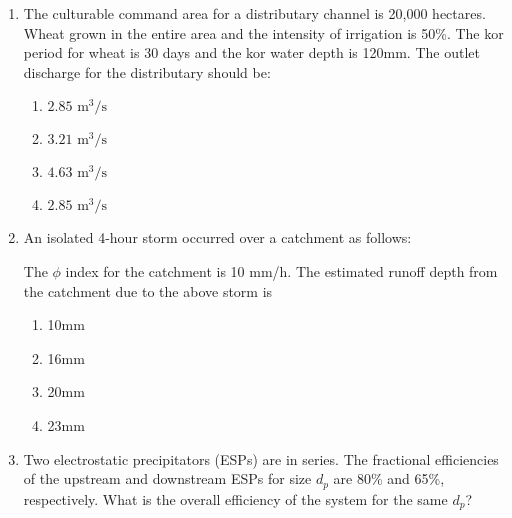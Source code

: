 \documentclass[journal]{IEEEtran}
\begin{document}
\begin{enumerate}
{        }
    \item{
     
           The culturable command area for a distributary channel is 20,000 hectares. Wheat grown in the entire area and the intensity of irrigation is 50\%. The kor period for wheat is 30 days and the kor water depth is 120mm. The outlet discharge for the distributary should be:\hfill
                
            \begin{multicols}{4}
                \begin{enumerate}
                	\item $2.85 \text{ m}^3/\text{s}$ 
                	
                	\item $3.21 \text{ m}^3/\text{s}$ 
                	
                	\item $4.63 \text{ m}^3/\text{s}$ 
                	
                	\item $2.85 \text{ m}^3/\text{s}$
                \end{enumerate}
            \end{multicols}
        
        }
 	\item{
        	An isolated 4-hour storm occurred over a catchment as follows:
        	
        	
        	
        	The $\phi$ index for the catchment is 10 mm/h. The estimated runoff depth from the catchment due to the above storm is\text{ }
        	\hfill
        	
        	
        	\begin{multicols}{4}
        		\begin{enumerate}
        			\item 10mm
        			\item 16mm
        			\item 20mm
        			\item 23mm
        		\end{enumerate}
        	\end{multicols}
        	
        }
 	\item{
			Two electrostatic precipitators (ESPs) are in series. The fractional efficiencies of the upstream and downstream ESPs for size $d_p$ are 80\% and 65\%, respectively. What is the overall efficiency of the system for the same $d_p$?
			\hfill
			
}
\end{enumerate}
\end{document}
